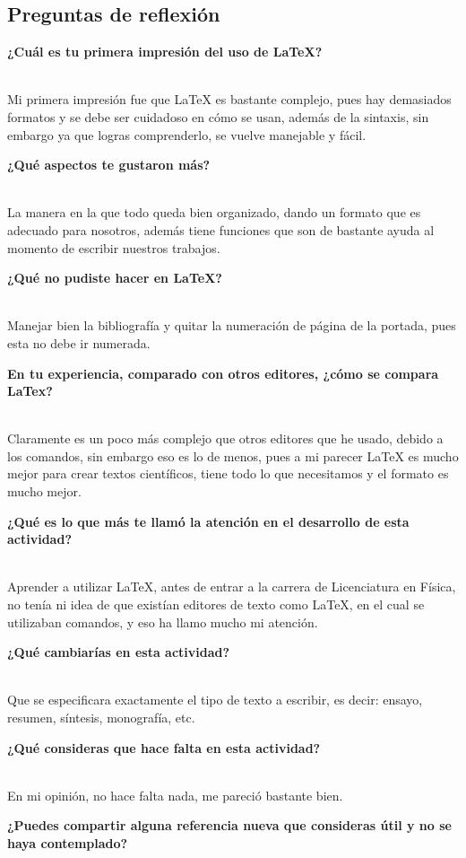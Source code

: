 \documentclass{article}
\begin{document}
\begin{center}
\section*{Preguntas de reflexión}
\end{center}
\begin{itemize}
{\item \bfseries ¿Cuál es tu primera impresión del uso de LaTeX?}
\\
Mi primera impresión fue que LaTeX es bastante complejo, pues hay demasiados formatos y se debe ser cuidadoso en cómo se usan, además de la sintaxis, sin embargo ya que logras comprenderlo, se vuelve manejable y fácil.
{\item \bfseries ¿Qué aspectos te gustaron más?}
\\
La manera en la que todo queda bien organizado, dando un formato que es adecuado para nosotros, además tiene funciones que son de bastante ayuda al momento de escribir nuestros trabajos.
{\item \bfseries ¿Qué no pudiste hacer en LaTeX?}
\\
Manejar bien la bibliografía y quitar la numeración de página de la portada, pues esta no debe ir numerada.
{\item \bfseries En tu experiencia, comparado con otros editores, ¿cómo se compara LaTex?}
\\
Claramente es un poco más complejo que otros editores que he usado, debido a los comandos, sin embargo eso es lo de menos, pues a mi parecer LaTeX es mucho mejor para crear textos científicos, tiene todo lo que necesitamos y el formato es mucho mejor.
{\item \bfseries ¿Qué es lo que más te llamó la atención en el desarrollo de esta actividad?}
\\
Aprender a utilizar LaTeX, antes de entrar a la carrera de Licenciatura en Física, no tenía ni idea de que existían editores de texto como LaTeX, en el cual se utilizaban comandos, y eso ha llamo mucho mi atención.
{\item \bfseries ¿Qué cambiarías en esta actividad?}
\\
Que se especificara exactamente el tipo de texto a escribir, es decir: ensayo, resumen, síntesis, monografía, etc.
{\item \bfseries ¿Qué consideras que hace falta en esta actividad?}
\\
En mi opinión, no hace falta nada, me pareció bastante bien.
{\item \bfseries ¿Puedes compartir alguna referencia nueva que consideras útil y no se haya contemplado?}

\end{itemize}
\end{document}
